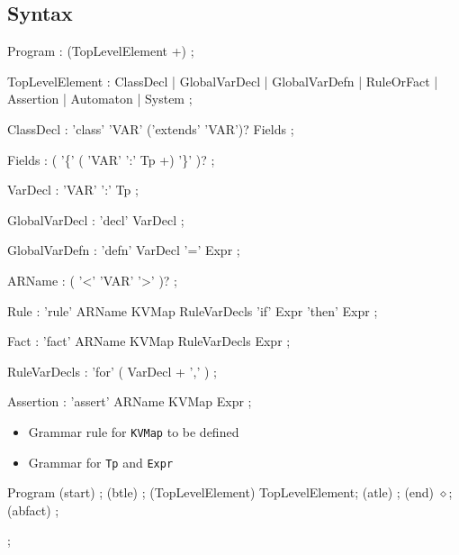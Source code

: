 
\subsection{Syntax}\label{sec:syntax}

\hypertarget{syn:NewProgram}{}
\begin{rail}
  Program : (TopLevelElement +)
  ;
\end{rail}

\begin{rail}
TopLevelElement : ClassDecl     
                | GlobalVarDecl 
                | GlobalVarDefn 
                | RuleOrFact    
                | Assertion     
                | Automaton     
                | System        
;

ClassDecl : 'class' 'VAR' ('extends' 'VAR')? Fields
;                

Fields : ( '\{' (  'VAR' ':' Tp  +) '\}' )?
;

VarDecl : 'VAR' ':' Tp
;

GlobalVarDecl : 'decl' VarDecl
;

GlobalVarDefn : 'defn' VarDecl '=' Expr  
;


ARName : ( '<' 'VAR' '>' )?
;

Rule : 'rule' ARName  KVMap RuleVarDecls 'if' Expr 'then' Expr
;

Fact : 'fact' ARName  KVMap RuleVarDecls Expr
;

RuleVarDecls : 'for' ( VarDecl + ',' )
;

Assertion : 'assert' ARName KVMap Expr
;
\end{rail}

\begin{itemize}
\item Grammar rule for \texttt{KVMap} to be defined
\item Grammar for \texttt{Tp} and \texttt{Expr}
\end{itemize}

\begin{syntaxdiagram}{Program}
  \node[junction,right=of Program] (start) {};
  \node[junction,right=of start] (btle) {};
  \node[nonterminal,right=of btle] (TopLevelElement) {TopLevelElement};
  \node[junction,right=of TopLevelElement] (atle) {};
  \node[junction,right=of atle] (end) {$\diamond$};
  \node[junction,above=of TopLevelElement] (abfact) {};

;

\end{syntaxdiagram}


